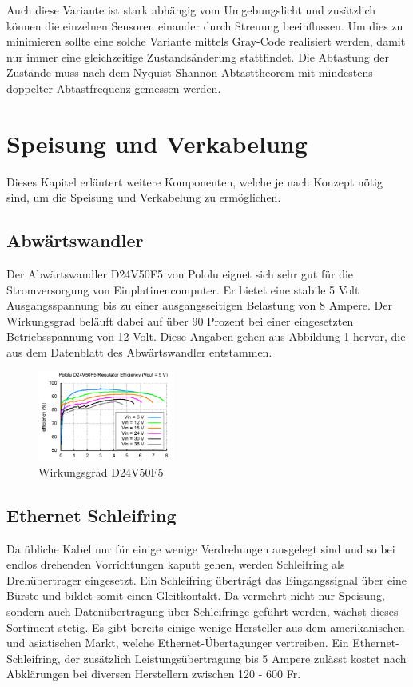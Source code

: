Auch diese Variante ist stark abhängig vom Umgebungslicht und zusätzlich können die einzelnen Sensoren einander durch Streuung beeinflussen. Um dies zu minimieren sollte eine solche Variante mittels Gray-Code realisiert werden, damit nur immer eine gleichzeitige Zustandsänderung stattfindet. Die Abtastung der Zustände muss nach dem Nyquist-Shannon-Abtasttheorem mit mindestens doppelter Abtastfrequenz gemessen werden.
 
\section{Speisung und Verkabelung}
\label{sec:Speisung und Verkabelung}

Dieses Kapitel erläutert weitere Komponenten, welche je nach Konzept nötig sind, um  die Speisung und Verkabelung zu ermöglichen.

\subsection{Abwärtswandler}
\label{subsec:Abwaertswandler}
Der Abwärtswandler D24V50F5 von Pololu eignet sich sehr gut für die Stromversorgung von Einplatinencomputer. Er bietet eine stabile 5 Volt Ausgangsspannung bis zu einer ausgangsseitigen Belastung von 8 Ampere. Der Wirkungsgrad beläuft dabei auf über 90 Prozent bei einer eingesetzten Betriebsspannung von 12 Volt. Diese Angaben gehen aus Abbildung \ref{fig:D24V50F5} hervor, die aus dem Datenblatt des Abwärtswandler entstammen.\cite{D24V50F5}
\begin{figure}[H]
	\centering
	\includegraphics[width=0.4\textwidth]
	{resources/D24V50F5.PNG}
	\caption[Wirkungsgrad D24V50F5]{Wirkungsgrad D24V50F5 \protect\cite{D24V50F5}}
	\label{fig:D24V50F5}
\end{figure}

\subsection{Ethernet Schleifring}
\label{subsec:Schleifring}
Da übliche Kabel nur für einige wenige Verdrehungen ausgelegt sind und so bei endlos drehenden Vorrichtungen kaputt gehen, werden Schleifring als Drehübertrager eingesetzt. Ein Schleifring überträgt das Eingangssignal über eine Bürste und bildet somit einen Gleitkontakt. Da vermehrt nicht nur Speisung, sondern auch Datenübertragung über Schleifringe geführt werden, wächst dieses Sortiment stetig. Es gibt bereits einige wenige Hersteller aus dem amerikanischen und asiatischen Markt, welche Ethernet-Übertagunger vertreiben. Ein Ethernet-Schleifring, der zusätzlich Leistungsübertragung bis 5 Ampere zulässt kostet nach Abklärungen bei diversen Herstellern zwischen 120 - 600 Fr.  


